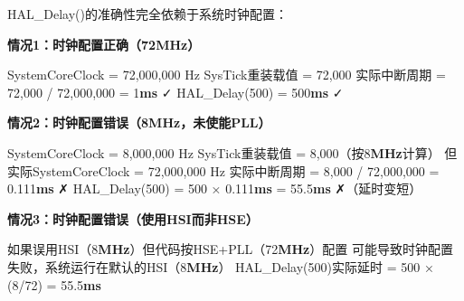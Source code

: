 \documentclass[
  chinese,
  UTF8,
  oneside,
  openany]{ctexbook}
\newenvironment{Shaded}{}{}
\newcommand{\BaseNTok}[1]{\textcolor[rgb]{0.25,0.63,0.44}{#1}}
\newcommand{\DecValTok}[1]{\textcolor[rgb]{0.25,0.63,0.44}{#1}}
\newcommand{\ErrorTok}[1]{\textcolor[rgb]{1.00,0.00,0.00}{\textbf{#1}}}
\newcommand{\FloatTok}[1]{\textcolor[rgb]{0.25,0.63,0.44}{#1}}
\newcommand{\NormalTok}[1]{#1}
\newcommand{\OperatorTok}[1]{\textcolor[rgb]{0.40,0.40,0.40}{#1}}
\begin{document}
HAL\_Delay()的准确性完全依赖于系统时钟配置：

\textbf{情况1：时钟配置正确（72MHz）}

\begin{Shaded}
\begin{Highlighting}[]
\NormalTok{SystemCoreClock }\OperatorTok{=} \DecValTok{72}\OperatorTok{,}\BaseNTok{000}\OperatorTok{,}\BaseNTok{000}\NormalTok{ Hz}
\NormalTok{SysTick重装载值 }\OperatorTok{=} \DecValTok{72}\OperatorTok{,}\BaseNTok{000}
\NormalTok{实际中断周期 }\OperatorTok{=} \DecValTok{72}\OperatorTok{,}\BaseNTok{000} \OperatorTok{/} \DecValTok{72}\OperatorTok{,}\BaseNTok{000}\OperatorTok{,}\BaseNTok{000} \OperatorTok{=} \DecValTok{1}\ErrorTok{ms}\NormalTok{ ✓}
\NormalTok{HAL\_Delay}\OperatorTok{(}\DecValTok{500}\OperatorTok{)} \OperatorTok{=} \DecValTok{500}\ErrorTok{ms}\NormalTok{ ✓}
\end{Highlighting}
\end{Shaded}

\textbf{情况2：时钟配置错误（8MHz，未使能PLL）}

\begin{Shaded}
\begin{Highlighting}[]
\NormalTok{SystemCoreClock }\OperatorTok{=} \DecValTok{8}\OperatorTok{,}\BaseNTok{000}\OperatorTok{,}\BaseNTok{000}\NormalTok{ Hz}
\NormalTok{SysTick重装载值 }\OperatorTok{=} \DecValTok{8}\OperatorTok{,}\BaseNTok{000}\NormalTok{（按}\DecValTok{8}\ErrorTok{MHz}\NormalTok{计算）}
\NormalTok{但实际SystemCoreClock }\OperatorTok{=} \DecValTok{72}\OperatorTok{,}\BaseNTok{000}\OperatorTok{,}\BaseNTok{000}\NormalTok{ Hz}
\NormalTok{实际中断周期 }\OperatorTok{=} \DecValTok{8}\OperatorTok{,}\BaseNTok{000} \OperatorTok{/} \DecValTok{72}\OperatorTok{,}\BaseNTok{000}\OperatorTok{,}\BaseNTok{000} \OperatorTok{=} \FloatTok{0.111}\ErrorTok{ms}\NormalTok{ ✗}
\NormalTok{HAL\_Delay}\OperatorTok{(}\DecValTok{500}\OperatorTok{)} \OperatorTok{=} \DecValTok{500}\NormalTok{ × }\FloatTok{0.111}\ErrorTok{ms} \OperatorTok{=} \FloatTok{55.5}\ErrorTok{ms}\NormalTok{ ✗（延时变短）}
\end{Highlighting}
\end{Shaded}

\textbf{情况3：时钟配置错误（使用HSI而非HSE）}

\begin{Shaded}
\begin{Highlighting}[]
\NormalTok{如果误用HSI（}\DecValTok{8}\ErrorTok{MHz}\NormalTok{）但代码按HSE}\OperatorTok{+}\NormalTok{PLL（}\DecValTok{72}\ErrorTok{MHz}\NormalTok{）配置}
\NormalTok{可能导致时钟配置失败，系统运行在默认的HSI（}\DecValTok{8}\ErrorTok{MHz}\NormalTok{）}
\NormalTok{HAL\_Delay}\OperatorTok{(}\DecValTok{500}\OperatorTok{)}\NormalTok{实际延时 }\OperatorTok{=} \DecValTok{500}\NormalTok{ × }\OperatorTok{(}\DecValTok{8}\OperatorTok{/}\DecValTok{72}\OperatorTok{)} \OperatorTok{=} \FloatTok{55.5}\ErrorTok{ms}
\end{Highlighting}
\end{Shaded}
\end{document}
